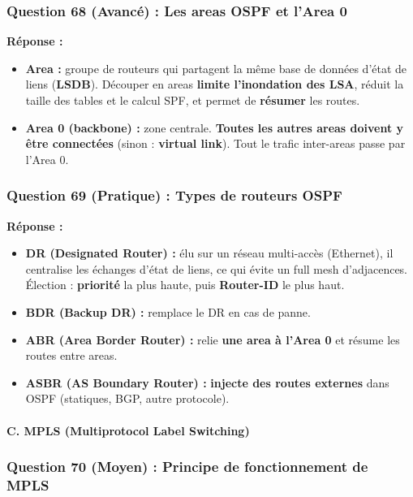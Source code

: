 \documentclass[12pt,a4paper]{article}
\newcommand{\reponse}{\textbf{Réponse :}\par}
\begin{document}
\subsubsection*{Question 68 (Avancé) : Les areas OSPF et l'Area 0}

\reponse
\begin{itemize}
    \item \textbf{Area :} groupe de routeurs qui partagent la même base
    de données d'état de liens (\textbf{LSDB}). Découper en areas
    \textbf{limite l'inondation des LSA}, réduit la taille des tables et
    le calcul SPF, et permet de \textbf{résumer} les routes.
    \item \textbf{Area 0 (backbone) :} zone centrale. \textbf{Toutes les
    autres areas doivent y être connectées} (sinon : \textbf{virtual
    link}). Tout le trafic inter-areas passe par l'Area 0.
\end{itemize}

\subsubsection*{Question 69 (Pratique) : Types de routeurs OSPF}

\reponse
\begin{itemize}
    \item \textbf{DR (Designated Router) :} élu sur un réseau
    multi-accès (Ethernet), il centralise les échanges d'état de liens,
    ce qui évite un full mesh d'adjacences. Élection : \textbf{priorité}
    la plus haute, puis \textbf{Router-ID} le plus haut.
    \item \textbf{BDR (Backup DR) :} remplace le DR en cas de panne.
    \item \textbf{ABR (Area Border Router) :} relie \textbf{une area à
    l'Area 0} et résume les routes entre areas.
    \item \textbf{ASBR (AS Boundary Router) :} \textbf{injecte des routes
    externes} dans OSPF (statiques, BGP, autre protocole).
\end{itemize}

\paragraph{C. MPLS (Multiprotocol Label Switching)}

\subsubsection*{Question 70 (Moyen) : Principe de fonctionnement de MPLS}
\end{document}
